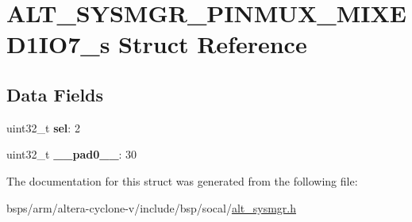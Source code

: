 \hypertarget{structALT__SYSMGR__PINMUX__MIXED1IO7__s}{}\section{A\+L\+T\+\_\+\+S\+Y\+S\+M\+G\+R\+\_\+\+P\+I\+N\+M\+U\+X\+\_\+\+M\+I\+X\+E\+D1\+I\+O7\+\_\+s Struct Reference}
\label{structALT__SYSMGR__PINMUX__MIXED1IO7__s}
\subsection*{Data Fields}
\begin{DoxyCompactItemize}
\item 
\mbox{\label{structALT__SYSMGR__PINMUX__MIXED1IO7__s_a627e675467eafe3dd2ba50ab59230857}} 
uint32\+\_\+t {\bfseries sel}\+: 2
\item 
\mbox{\label{structALT__SYSMGR__PINMUX__MIXED1IO7__s_aee651f5c2b6aa3aa2541210f20e2e025}} 
uint32\+\_\+t {\bfseries \+\_\+\+\_\+pad0\+\_\+\+\_\+}\+: 30
\end{DoxyCompactItemize}


The documentation for this struct was generated from the following file\+:\begin{DoxyCompactItemize}
\item 
bsps/arm/altera-\/cyclone-\/v/include/bsp/socal/\mbox{\hyperlink{alt__sysmgr_8h}{alt\+\_\+sysmgr.\+h}}\end{DoxyCompactItemize}
